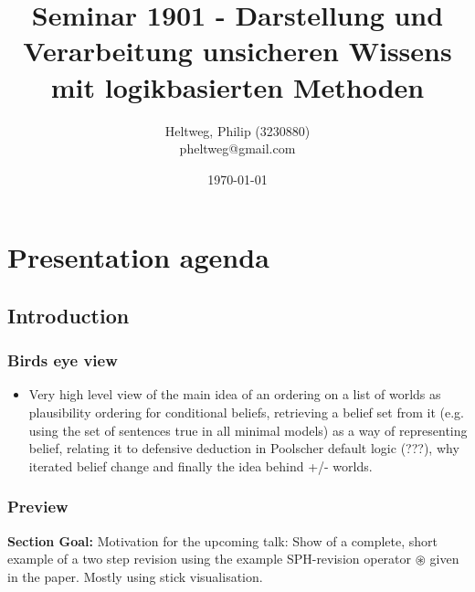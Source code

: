 \documentclass[11pt]{article}
\begin{document}
\title{Seminar 1901 - Darstellung und Verarbeitung unsicheren Wissens mit logikbasierten Methoden}
\author{
	Heltweg, Philip (3230880) \\
	pheltweg@gmail.com
}
\date{\today}
\maketitle

\newpage

\tableofcontents

\newpage

\section{Presentation agenda}
\subsection{Introduction}
\subsubsection{Birds eye view}
\begin{itemize}
    \item Very high level view of the main idea of an ordering on a list of worlds as plausibility ordering for conditional beliefs, retrieving a belief set from it (e.g. using the set of sentences true in all minimal models) as a way of representing belief, relating it to defensive deduction in Poolscher default logic (???), why iterated belief change and finally the idea behind +/- worlds.
\end{itemize}
\subsubsection{Preview}
\textbf{Section Goal:} Motivation for the upcoming talk: Show of a complete, short example of a two step revision using the example SPH-revision operator $\circledast$ given in the paper. Mostly using stick visualisation.
\end{document}
